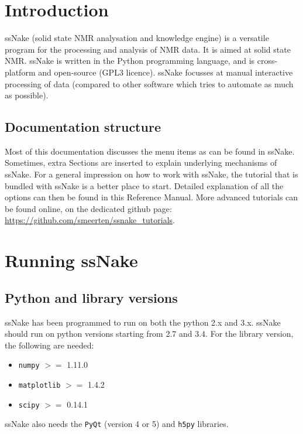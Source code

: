 \documentclass[11pt,a4paper]{article}
\renewcommand\cfttoctitlefont{\color{black!70}\Huge\fontfamily{SourceSansPro-LF}\bfseries}
\begin{document}


\thispagestyle{empty}
\newpage
\mbox{}


\renewcommand\cfttoctitlefont{\color{black}\Huge\fontfamily{SourceSansPro-LF}\bfseries}
\setcounter{tocdepth}{2}
\tableofcontents %

\renewcommand\cfttoctitlefont{\color{black!70}\Huge\fontfamily{SourceSansPro-LF}\bfseries}


\section{Introduction}
ssNake (solid state NMR analysation and knowledge engine) is a versatile program for the processing
and analysis of NMR data. It is aimed at solid state NMR. ssNake is written in the Python programming
language, and is cross-platform and open-source (GPL3 licence). ssNake focusses at manual interactive
processing of data (compared to other software which tries to automate as much as possible).

\subsection{Documentation structure}
Most of this documentation discusses the menu items as can be found in ssNake. Sometimes, extra
Sections are inserted to explain underlying mechanisms of ssNake. For a general impression on how to
work with ssNake, the tutorial that is bundled with ssNake is a better place to start. Detailed
explanation of all the options can then be found in this Reference Manual. More advanced tutorials
can be found online, on the dedicated github page:
\url{https://github.com/smeerten/ssnake_tutorials}.


\section{Running ssNake}
\subsection{Python and library versions}
ssNake has been programmed to run on both the python 2.x and 3.x. ssNake should run on python
versions starting from 2.7 and 3.4.
For the library version, the following are needed:
\begin{itemize}
  \item  \texttt{numpy} $>=$ 1.11.0
  \item  \texttt{matplotlib} $>=$ 1.4.2
  \item  \texttt{scipy} $>=$ 0.14.1
\end{itemize}
ssNake also needs the \texttt{PyQt} (version 4 or 5) and \texttt{h5py} libraries.
\end{document}
